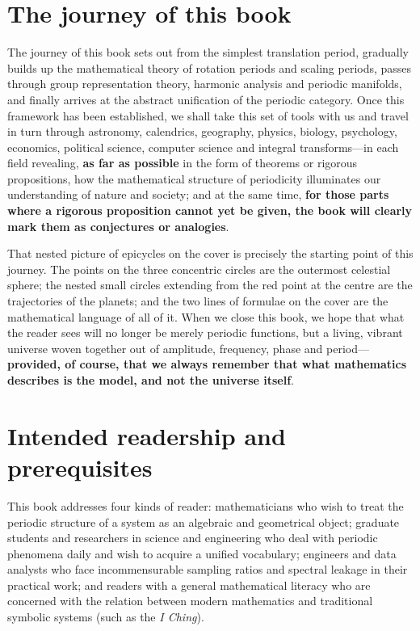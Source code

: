 \section*{The journey of this book}

The journey of this book sets out from the simplest translation period, gradually builds up the mathematical theory of rotation periods and scaling periods, passes through group representation theory, harmonic analysis and periodic manifolds, and finally arrives at the abstract unification of the periodic category. Once this framework has been established, we shall take this set of tools with us and travel in turn through astronomy, calendrics, geography, physics, biology, psychology, economics, political science, computer science and integral transforms---in each field revealing, \textbf{as far as possible} in the form of theorems or rigorous propositions, how the mathematical structure of periodicity illuminates our understanding of nature and society; and at the same time, \textbf{for those parts where a rigorous proposition cannot yet be given, the book will clearly mark them as conjectures or analogies}.

That nested picture of epicycles on the cover is precisely the starting point of this journey. The points on the three concentric circles are the outermost celestial sphere; the nested small circles extending from the red point at the centre are the trajectories of the planets; and the two lines of formulae on the cover are the mathematical language of all of it. When we close this book, we hope that what the reader sees will no longer be merely periodic functions, but a living, vibrant universe woven together out of amplitude, frequency, phase and period---\textbf{provided, of course, that we always remember that what mathematics describes is the model, and not the universe itself}.

\section*{Intended readership and prerequisites}

This book addresses four kinds of reader: mathematicians who wish to treat the periodic structure of a system as an algebraic and geometrical object; graduate students and researchers in science and engineering who deal with periodic phenomena daily and wish to acquire a unified vocabulary; engineers and data analysts who face incommensurable sampling ratios and spectral leakage in their practical work; and readers with a general mathematical literacy who are concerned with the relation between modern mathematics and traditional symbolic systems (such as the \textit{I Ching}).

